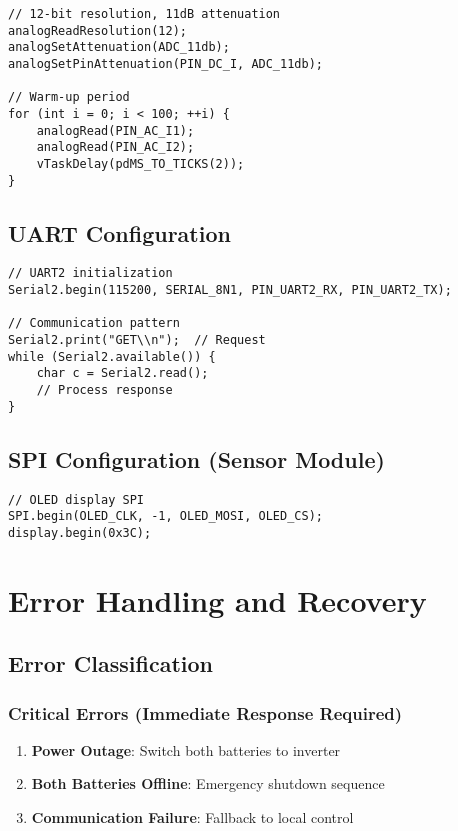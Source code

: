 \documentclass[11pt,a4paper]{article}
\begin{document}
\begin{lstlisting}[caption=ADC Configuration]
// 12-bit resolution, 11dB attenuation
analogReadResolution(12);
analogSetAttenuation(ADC_11db);
analogSetPinAttenuation(PIN_DC_I, ADC_11db);

// Warm-up period
for (int i = 0; i < 100; ++i) {
    analogRead(PIN_AC_I1);
    analogRead(PIN_AC_I2);
    vTaskDelay(pdMS_TO_TICKS(2));
}
\end{lstlisting}

\subsection{UART Configuration}

\begin{lstlisting}[caption=UART Configuration]
// UART2 initialization
Serial2.begin(115200, SERIAL_8N1, PIN_UART2_RX, PIN_UART2_TX);

// Communication pattern
Serial2.print("GET\\n");  // Request
while (Serial2.available()) {
    char c = Serial2.read();
    // Process response
}
\end{lstlisting}

\subsection{SPI Configuration (Sensor Module)}

\begin{lstlisting}[caption=SPI Configuration]
// OLED display SPI
SPI.begin(OLED_CLK, -1, OLED_MOSI, OLED_CS);
display.begin(0x3C);
\end{lstlisting}

\section{Error Handling and Recovery}

\subsection{Error Classification}

\subsubsection{Critical Errors (Immediate Response Required)}
\begin{enumerate}
    \item \textbf{Power Outage}: Switch both batteries to inverter
    \item \textbf{Both Batteries Offline}: Emergency shutdown sequence
    \item \textbf{Communication Failure}: Fallback to local control
\end{enumerate}
\end{document}
